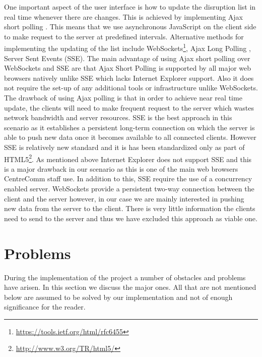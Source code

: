 
One important aspect of the user interface is how to update the disruption list in real time whenever there are changes. This is achieved by implementing Ajax short polling \cite{bozdag2007comparison}. This means that we use asynchronous JavaScript on the client side to make request to the server at predefined intervals. Alternative methods for implementing the updating of the list include WebSockets\footnote{\url{https://tools.ietf.org/html/rfc6455}}, Ajax Long Polling \cite{bozdag2007comparison}, Server Sent Events (SSE)\cite{serverSentEvents}. The main advantage of using Ajax short polling over WebSockets and SSE are that Ajax Short Polling is supported by all major web browsers natively unlike SSE which lacks Internet Explorer support. Also it does not require the set-up of any additional tools or infrastructure unlike WebSockets. The drawback of using Ajax polling is that in order to achieve near real time update, the clients will need to make frequent request to the server which wastes network bandwidth and server resources. SSE is the best approach in this scenario as it establishes a persistent long-term connection on which the server is able to push new data once it becomes available to all connected clients. However SSE is relatively new standard and it is has been standardized only as part of HTML5\footnote{\url{http://www.w3.org/TR/html5/}}. As mentioned above Internet Explorer does not support SSE and this is a major drawback in our scenario as this is one of the main web browsers CentreComm staff use. In addition to this, SSE require the use of a concurrency enabled server. WebSockets provide a persistent two-way connection between the client and the server however, in our case we are mainly interested in pushing new data from the server to the client. There is very little information the clients need to send to the server and thus we have excluded this approach as viable one.

\section{Problems}
During the implementation of the project a number of obstacles and problems have arisen. In this section we discuss the major ones. All that are not mentioned below are assumed to be solved by our implementation and not of enough significance for the reader.

